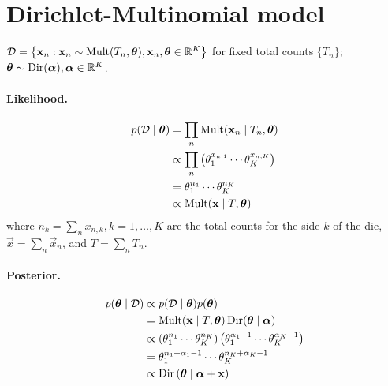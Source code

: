 \section{Dirichlet-Multinomial model}
$\mathcal D = \left\{\boldsymbol{\mathbf{x}}_n : \boldsymbol{\mathbf{x}}_n \sim \operatorname{Mult}(T_n, \boldsymbol{\mathbf{\theta}}), \boldsymbol{\mathbf{x}}_n, \boldsymbol{\mathbf{\theta}} \in \mathbb R^K \right\}$ for fixed total counts $\{T_n\}$; $\boldsymbol{\mathbf{\theta}} \sim \operatorname{Dir}(\boldsymbol{\mathbf{\alpha}}), \boldsymbol{\mathbf{\alpha}} \in \mathbb R^K$.

\paragraph{Likelihood.}
    \begin{align*}
        p(\mathcal D \mid \boldsymbol{\mathbf{\theta}})  &= \prod_n \operatorname{Mult}(\boldsymbol{\mathbf{x}}_n \mid T_n, \boldsymbol{\mathbf{\theta}}) \\
                                        &\propto \prod_n \left(\theta_1^{x_{n, 1}} \cdots \theta_K^{x_{n, K}}\right) \\
                                        &= \theta_1^{n_1} \cdots \theta_K^{n_K} \\
                                        &\propto \operatorname{Mult}(\boldsymbol{\mathbf{x}} \mid T, \boldsymbol{\mathbf{\theta}})
    \end{align*}
    where $n_k = \sum_n x_{n, k}, k = 1, \dotsc, K$ are the total counts for the side $k$ of the die, $\vec x = \sum_n \vec x_n$, and $T = \sum_n T_n$.

\paragraph{Posterior.}
    \begin{align*}
        p(\boldsymbol{\mathbf{\theta}} \mid \mathcal D)  &\propto p(\mathcal D \mid \boldsymbol{\mathbf{\theta}}) p(\boldsymbol{\mathbf{\theta}}) \\
                                        &= \operatorname{Mult}(\boldsymbol{\mathbf{x}} \mid T, \boldsymbol{\mathbf{\theta}}) \operatorname{Dir}(\boldsymbol{\mathbf{\theta}} \mid \boldsymbol{\mathbf{\alpha}}) \\
                                        &\propto \left(\theta_1^{n_1} \cdots \theta_K^{n_K}\right) \left(\theta_1^{\alpha_1 - 1} \cdots \theta_K^{\alpha_K - 1}\right) \\
                                        &= \theta_1^{n_1 + \alpha_1 - 1} \cdots \theta_K^{n_K + \alpha_K - 1} \\
                                        &\propto \operatorname{Dir}\left(\boldsymbol{\mathbf{\theta}} \mid \boldsymbol{\mathbf{\alpha}} + \boldsymbol{\mathbf{x}}\right)
    \end{align*}

